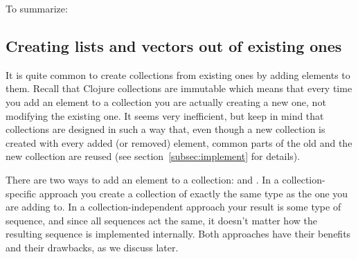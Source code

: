 To summarize: 

\subsection{Creating lists and vectors out of existing ones}\label{subsec:conj-lists-vectors}
It is quite common to create collections from existing ones by adding elements to them. Recall that Clojure collections are immutable which means that every time you add an element to a collection you are actually creating a new one, not modifying the existing one. %
It seems very inefficient, but keep in mind that collections are designed in such a way that, even though a new collection is created with every added (or removed) element, common parts of the old and the new collection are reused (see section~\ref{subsec:implement} for details).  

There are two ways to add an element to a collection:  and . In a collection-specific approach you create a collection of exactly the same type as the one you are adding to. In a collection-independent approach your result is some type of  sequence, and since all sequences act the same, it doesn't matter how the resulting sequence is implemented internally. Both approaches have their benefits and their drawbacks, as we discuss later. 

